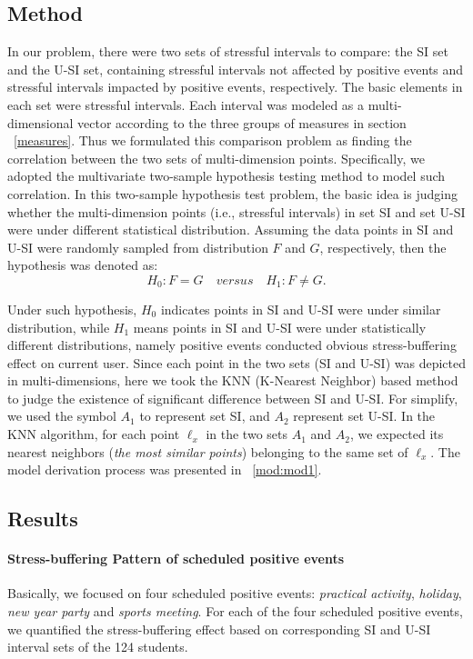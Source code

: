 \subsection{Method}
In our problem,
there were two sets of stressful intervals to compare:
the SI set and the U-SI set,
containing stressful intervals not affected by positive events
and stressful intervals impacted by positive events, respectively.
The basic elements in each set were stressful intervals.
Each interval was modeled as a multi-dimensional vector according to the three groups of measures in section ~\ref{measures}.
Thus we formulated this comparison problem as finding the correlation between the two sets of multi-dimension points.
Specifically, we adopted the multivariate two-sample hypothesis testing method
\cite{Li2017Correlating,Johnson2012Applied} to model such correlation.
In this two-sample hypothesis test problem,
the basic idea is judging whether the multi-dimension points (i.e., stressful intervals)
in set SI and set U-SI were under different statistical distribution.
Assuming the data points in SI and U-SI were randomly sampled from distribution $F$ and $G$, respectively,
then the hypothesis was denoted as:
\begin{equation}
H_0: F = G \quad versus \quad H_1: F \neq G.
\end{equation}

Under such hypothesis,
$H_0$ indicates points in SI and U-SI were under similar distribution,
while $H_1$ means points in SI and U-SI were under statistically different distributions, 
namely positive events conducted obvious stress-buffering effect on current user.
Since each point in the two sets (SI and U-SI) was depicted in multi-dimensions, 
here we took the KNN (K-Nearest Neighbor) \cite{Schilling1986Multivariate}
based method to judge the existence of significant difference between SI and U-SI. 
For simplify, we used the symbol $A_1$ to represent set SI, 
and $A_2$ represent set U-SI. 
In the KNN algorithm,
for each point $\ell_{x}$ in the two sets $A_1$ and $A_2$,
we expected its nearest neighbors (\emph{the most similar points}) belonging to the same set of $\ell_x$. 
The model derivation process was presented in ~\ref{mod:mod1}.

\subsection{Results}
\paragraph{Stress-buffering Pattern of scheduled positive events}
Basically, we focused on four scheduled positive events: 
\emph{practical activity}, \emph{holiday}, \emph{new year party} and \emph{sports meeting}. 
For each of the four scheduled positive events,
we quantified the stress-buffering effect based on corresponding SI and U-SI interval sets of the 124 students. 

